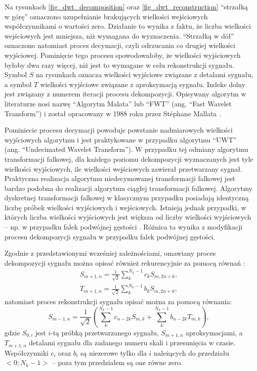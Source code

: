 Na rysunkach \ref{fig_dwt_decomposition} oraz \ref{fig_dwt_reconstruction} \enquote{strzałką w górę} oznaczono uzupełnianie brakujących wielkości wejściowych współczynnikami o wartości zero. Działanie to wynika z faktu, że liczba wielkości wejściowych jest mniejsza, niż wymagana do wyznaczenia. \enquote{Strzałką w dół} oznaczono natomiast proces decymacji, czyli odrzucania co drugiej wielkości wyjściowej. Pominięcie tego procesu spowodowałoby, że wielkości wyjściowych byłoby dwa razy więcej, niż jest to wymagane w celu rekonstrukcji sygnału. Symbol $S$ na rysunkach oznacza wielkości wyjściowe związane z detalami sygnału, a symbol $T$ wielkości wyjściowe związane z aproksymacją sygnału. Indeks dolny jest związany z numerem iteracji procesu dekompozycji. Opisywany algorytm w literaturze nosi nazwę \enquote{Algorytm Malata} lub \enquote{FWT} (ang. \enquote{Fast Wavelet Transform}) i został opracowany w 1988 roku przez Stéphane Mallata \cite{lujian_mallat}.

Pominiecie procesu decymacji powoduje powstanie nadmiarowych wielkości wyjściowych algorytmu i jest praktykowane w przypadku algorytmu \enquote{UWT} (ang. \enquote{Undecimated Wavelet Transform}). W przypadku tej odmiany algorytmu transformacji falkowej, dla każdego poziomu dekompozycji wyznaczanych jest tyle wielkości wyjściowych, ile wielkości wejściowych zawierał przetwarzany sygnał. Praktyczna realizacja algorytmu niedecymowanej transformacji falkowej jest bardzo podobna do realizacji algorytmu ciągłej transformacji falkowej. Algorytmy dyskretnej transformacji falkowej w klasycznym przypadku posiadają identyczną liczbę próbek wielkości wyjściowych i wejściowych. Istnieją jednak przypadki, w których liczba wielkości wyjściowych jest większa od liczby wielkości wyjściowych -- np. w przypadku falek podwójnej gęstości \cite{selenick_ddenusage}. Różnica ta wynika z modyfikacji procesu dekompozycji sygnału w przypadku falek podwójnej gęstości.

Zgodnie z przedstawionymi wcześniej zależnościami, omawiany proces dekompozycji sygnału można opisać również rekurencyjnie za pomocą równań \cite{wallen_handbook}:
\begin{gather}
S_{m+1,n} = \frac{1}{\sqrt{2}} \sum _{k} ^{N_k-1} c_{k} S_{m,2n+k} \label{eqn_dwt_aproxrek}, \\
T_{m+1,n} = \frac{1}{\sqrt{2}} \sum _{k} ^{N_k-1} b_{k} S_{m,2n+k} \label{eqn_dwt_detailrek},
\end{gather}
natomiast proces rekonstrukcji sygnału opisać można za pomocą równania:
\begin{equation}
S_{m-1,n} = \frac{1}{\sqrt{2}} \left( \sum _{k} ^{N_k-1} c_{n-2k} S_{m,k} + \sum _{k} ^{N_k-1} b_{n-2k} T_{m,k} \right) \label{eqn_dwt_reconrek},
\end{equation}
gdzie $S_{0,i}$ jest $i$-tą próbką przetwarzanego sygnału, $S_{m+1,n}$ aproksymacjami, a $T_{m+1,n}$ detalami sygnału dla zadanego numeru skali i przesunięcia w czasie. Współczynniki $c_i$ oraz $b_i$ są niezerowe tylko dla $i$ należących do przedziału $<0;N_k-1>$ -- poza tym przedziałem są one równe zero.

